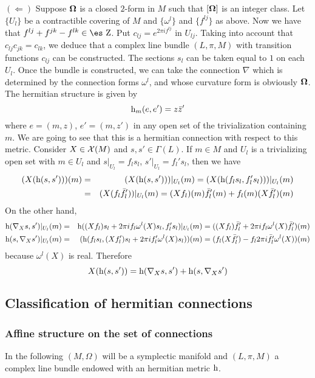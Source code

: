 \documentclass[12pt]{article}
\def\beann{\begin{eqnarray*}}
\def\eeann{\end{eqnarray*}}
\def\qed{\ifvmode\removelastskip\fi
{\unskip\nobreak\hfil\penalty50\hbox{}\nobreak\hfil
\hbox{\vrule height1.2ex width1.2ex}\parfillskip=0pt
\finalhyphendemerits=0 \par\smallskip}}
\def\h{{\rm h}}
\def\curv{{\bf \Omega}}
\def\Zahl{\mbox{\es Z}}
\begin{document}
\quad
$(\Longleftarrow)$ \quad
Suppose $\curv $ is a closed $2$-form in $M$ such that
$[\curv ]$ is an integer class.
Let $\{ U_l \}$ be a contractible covering of $M$
and  $\{ \omega^l  \}$ and $\{ f^{l j} \}$ as above.
Now we have that
$f^{l j} + f^{jk} - f^{l k} \in \Zahl$.
Put $c_{l j} = e^{2\pi i f^{l j}}$ in $U_{l j}$.
Taking into account that $c_{l j} c_{jk} = c_{l k}$,
we deduce that a complex line bundle
$(L,\pi ,M)$ with transition functions $c_{l j}$ can be constructed.
The sections $s_l$ can be taken equal to $1$ on each $U_l$.
Once the bundle is constructed, we can take the connection $\nabla$
which is determined by the connection forms
$\omega^l$, and whose curvature form is obviously $\curv $.
The hermitian structure is given by
$$
\h_m(e,e') = z \bar z'
$$
where $e = (m,z)$, $e' = (m,z')$
in any open set of the trivialization containing $m$.
We are going to see that this is
a hermitian connection with respect to this metric. Consider
$X \in {\cal X}(M)$ and $s,s' \in \Gamma (L)$. If
$m \in M$ and $U_l$ is a trivializing open set with $m \in U_l$ and
$s \vert_{U_l} = f_ls_l$, $s' \vert_{U_l} = f_l 's_l$, then we have
\beann
(X(\h (s,s')))(m)
&=&
(X(\h (s,s')))\vert_{U_l}(m)=
(X(\h (f_l s_l,f_l 's_l)))\vert_{U_l}(m)
\\
&=&
(X(f_l \bar f_l '))\vert_{U_l}(m)=
(Xf_l )(m) \bar f_l '(m) + f_l (m)(X \bar f_l ')(m)
\eeann
On the other hand,
\beann
\h (\nabla_X s,s')\vert_{U_l}(m)
&=&
\h ((Xf_l )s_l + 2 \pi i f_l\omega^l  (X)
 s_l ,f_l 's_l )\vert_{U_l}(m)=
((Xf_l )\bar f_l ' + 2 \pi i f_l\omega^l  (X) \bar f_l ')(m)
\\
\h (s,\nabla_Xs')\vert_{U_l}(m)
&=&
(\h (f_l s_l ,(Xf_l ')s_l+ 2 \pi i f_l '\omega^l(X) s_l))(m)=
(f_l (X \bar{f_l '}) -  f_l 2 \pi i \bar{f_l '}\omega^l  (X))(m)
\eeann
because $\omega^l  (X)$ is real. Therefore
$$
X(\h (s,s')) =
\h (\nabla_X s,s') + \h (s,\nabla_Xs')
$$
\qed



\subsection{Classification of hermitian connections}


\subsubsection{Affine structure on the set of connections}


In the following
$(M,\Omega)$ will be a symplectic manifold and
$(L,\pi , M)$ a complex line bundle
endowed with an hermitian metric $\h$.
\end{document}
